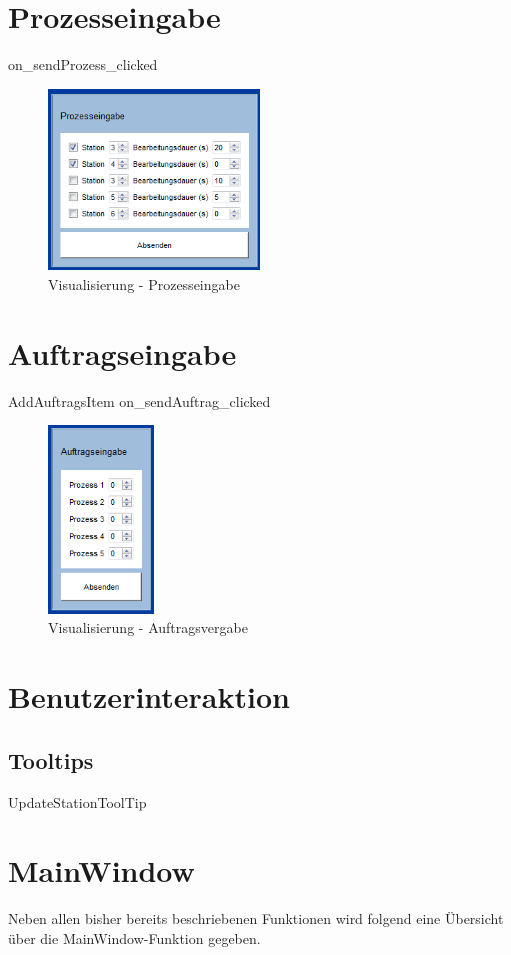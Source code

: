 \section{Prozesseingabe}
\label{sec:Prozesseingabe}

on_sendProzess_clicked

\begin{figure}[htb]
    \centering
    \includegraphics[width=0.5\textwidth]{Abbildungen/Prozesseingabe.png}
    \caption{Visualisierung - Prozesseingabe}		
    \label{fig:Prozesseingabe}
\end{figure}

\section{Auftragseingabe}
\label{sec:Auftragseingabe}

AddAuftragsItem
on_sendAuftrag_clicked

\begin{figure}[htb]
    \centering
    \includegraphics[width=0.25\textwidth]{Abbildungen/Auftragsvergabe.png}
    \caption{Visualisierung - Auftragsvergabe}		
    \label{fig:Auftragsvergabe}
\end{figure}


\section{Benutzerinteraktion}

\subsection{Tooltips}
\label{sec:tooltips}
UpdateStationToolTip

\section{MainWindow}

Neben allen bisher bereits beschriebenen Funktionen wird folgend eine Übersicht über die MainWindow-Funktion gegeben. 

